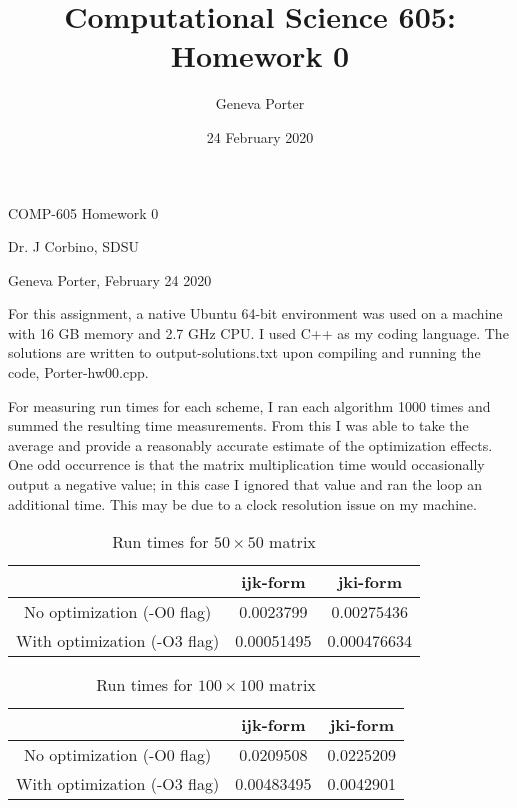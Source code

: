 \documentclass[12pt]{article}
\title{Computational Science 605: Homework 0}
\author{Geneva Porter}
\date{24 February 2020}
\begin{document}
\begin{center}
	{\Huge COMP-605 Homework 0}
	
	\vspace{5mm}
	
	{\Large Dr. J Corbino, SDSU}
	
	\vspace{5mm}
	
	{\large Geneva Porter, February 24 2020}
	
	\vspace{5mm}
\end{center}

For this assignment, a native Ubuntu 64-bit environment was used on a machine with 16 GB memory and 2.7 GHz CPU. I used C++ as my coding language. The solutions are written to output-solutions.txt upon compiling and running the code, Porter-hw00.cpp.

For measuring run times for each scheme, I ran each algorithm 1000 times and summed the resulting time measurements. From this I was able to take the average and  provide a reasonably accurate estimate of the optimization effects. One odd occurrence is that the matrix multiplication time would occasionally output a negative value; in this case I ignored that value and ran the loop an additional time. This may be due to a clock resolution issue on my machine. 


\begin{table}[h]
    \centering
    \begin{tabular}{|c|c|c|} \hline
        ~ & ijk-form & jki-form \\ \hline
         No optimization (-O0 flag)&  0.0023799 & 0.00275436\\ \hline
         With optimization (-O3 flag)& 0.00051495 & 0.000476634 \\ \hline
    \end{tabular}
	\caption{Run times for $50\times50$ matrix}
\end{table}

\begin{table}[h]
	\centering
	\begin{tabular}{|c|c|c|} \hline
		~ & ijk-form & jki-form \\ \hline
		No optimization (-O0 flag)&  0.0209508 & 0.0225209\\ \hline
		With optimization (-O3 flag)& 0.00483495 & 0.0042901 \\ \hline
	\end{tabular}
	\caption{Run times for $100\times100$ matrix}
\end{table}
\end{document}
